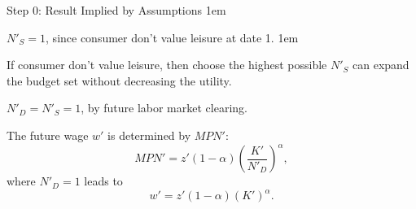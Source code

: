 \documentclass[11pt,aspectratio=43]{beamer}
\let\olditemize=\itemize
\let\endolditemize=\enditemize
\renewenvironment{itemize}{\olditemize \itemsep1em}{\endolditemize}
\let\oldenumerate=\enumerate
\let\endoldenumerate=\endenumerate
\renewenvironment{enumerate}{\oldenumerate \itemsep1em}{ \endoldenumerate}
\theoremstyle{definition}
\begin{document}
\begin{frame}{Step 0: Result Implied by Assumptions}
\label{slide:Step_0__Result_Implied_by_Assumptions}
    \begin{enumerate}
        \item $ N'_{S} = 1 $, since consumer don't value leisure at date 1.
        \begin{itemize}
            \item If consumer don't value leisure, then choose the highest possible $ N'_{S} $ can expand the budget set without decreasing the utility.
        \end{itemize}
        \item $ N'_{D} = N'_{S} = 1 $, by future labor market clearing.
        \item The future wage $ w' $ is determined by $ MPN' $:
        \begin{equation*}
            MPN' = z' ( 1-\alpha ) \left(
                \frac{K'}{N'_{D}}
            \right)^{\alpha}
        ,\end{equation*}
        where $ N'_{D} = 1 $ leads to
        \begin{equation*}
            w' = z' ( 1-\alpha ) ( K' )^{\alpha}
        .\end{equation*}
    \end{enumerate}
\end{frame}
\end{document}
